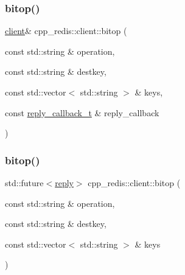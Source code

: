 \mbox{\label{classcpp__redis_1_1client_a9289b0f474073f59509b565d93c69506}} 
\subsubsection{\texorpdfstring{bitop()}{bitop()}\hspace{0.1cm}{\footnotesize\ttfamily [1/2]}}
{\footnotesize\ttfamily \hyperlink{classcpp__redis_1_1client}{client}\& cpp\+\_\+redis\+::client\+::bitop (\begin{DoxyParamCaption}\item[{const std\+::string \&}]{operation,  }\item[{const std\+::string \&}]{destkey,  }\item[{const std\+::vector$<$ std\+::string $>$ \&}]{keys,  }\item[{const \hyperlink{classcpp__redis_1_1client_a061a1140d36d2eaeda82b09a0bb3f9f2}{reply\+\_\+callback\+\_\+t} \&}]{reply\+\_\+callback }\end{DoxyParamCaption})}

\mbox{\label{classcpp__redis_1_1client_adbb955ee435dea43898ef811b31421b3}} 
\subsubsection{\texorpdfstring{bitop()}{bitop()}\hspace{0.1cm}{\footnotesize\ttfamily [2/2]}}
{\footnotesize\ttfamily std\+::future$<$\hyperlink{classcpp__redis_1_1reply}{reply}$>$ cpp\+\_\+redis\+::client\+::bitop (\begin{DoxyParamCaption}\item[{const std\+::string \&}]{operation,  }\item[{const std\+::string \&}]{destkey,  }\item[{const std\+::vector$<$ std\+::string $>$ \&}]{keys }\end{DoxyParamCaption})}

\mbox{\label{classcpp__redis_1_1client_adf2ef5d020a8efbf6f6eb91cde63f262}} 
